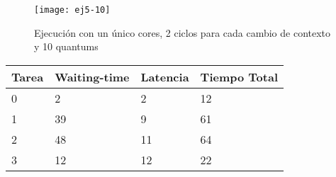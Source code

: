 \begin{figure}[H]
		\centering
		\texttt{[image: ej5-10]}
		\caption{Ejecución con un único cores, 2 ciclos para cada cambio de contexto y 10 quantums}
		\label{fig:ej5-10}
\end{figure}

\begin{center}
		\begin{tabular}{| l | l | l | l |}
				\hline
				Tarea & Waiting-time & Latencia & Tiempo Total	\\ \hline
				0     &  2           &  2       & 12            \\
				1     &  39          &  9       & 61            \\
				2     &  48          &  11      & 64            \\
				3     &  12          &  12      & 22            \\
				\hline
		\end{tabular}
\end{center}
